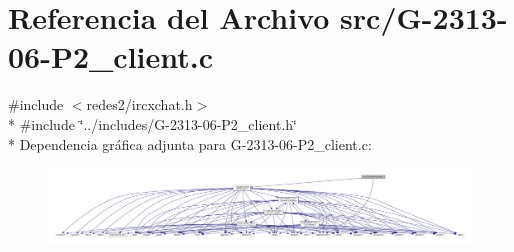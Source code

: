 \hypertarget{G-2313-06-P2__client_8c}{}\section{Referencia del Archivo src/\+G-\/2313-\/06-\/\+P2\+\_\+client.c}
\label{G-2313-06-P2__client_8c}
{\ttfamily \#include $<$redes2/ircxchat.\+h$>$}\\*
{\ttfamily \#include \char`\"{}../includes/\+G-\/2313-\/06-\/\+P2\+\_\+client.\+h\char`\"{}}\\*
Dependencia gráfica adjunta para G-\/2313-\/06-\/\+P2\+\_\+client.c\+:\nopagebreak
\begin{figure}[H]
\begin{center}
\leavevmode
\includegraphics[width=350pt]{G-2313-06-P2__client_8c__incl}
\end{center}
\end{figure}
